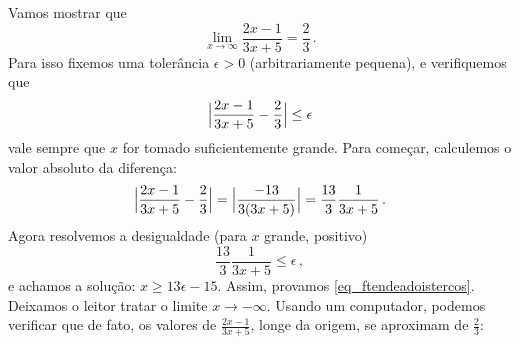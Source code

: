 \begin{Solution}{4.3}
%
Vamos mostrar que
\begin{equation}\label{eq_ftendeadoistercos}
\lim_{x\to \infty}\frac{2x-1}{3x+5} =\frac23\,.
\end{equation}
Para isso fixemos uma tolerância $\epsilon>0$ (arbitrariamente pequena),
e verifiquemos que
\[
\Bigl|\frac{2x-1}{3x+5}-\frac23\Bigr|\leq \epsilon
\]
vale sempre que $x$ for tomado suficientemente grande.
Para começar, calculemos o valor absoluto da diferença:
\begin{equation}\label{eq_calculdifff}
\Bigl|\frac{2x-1}{3x+5}-\frac23\Bigr|=
\Bigl|\frac{-13}{3(3x+5)}\Bigr|=\frac{13}{3}
\frac{1}{3x+5}\,.
\end{equation}
Agora resolvemos a desigualdade (para $x$ grande, positivo)
\[ \frac{13}{3} \frac{1}{3x+5}
\leq \epsilon\,,
\]
e achamos a solução:
$x\geq 13\epsilon-15$. Assim, provamos
\eqref{eq_ftendeadoistercos}.
Deixamos o leitor tratar o limite
$x\to-\infty$.
Usando um computador, podemos verificar que de fato, os valores
de $\frac{2x-1}{3x+5}$, longe da origem, se aproximam
de $\tfrac23$:

\begin{center}
\begin{bmlimage}\end{bmlimage}
\end{center}
\end{Solution}
